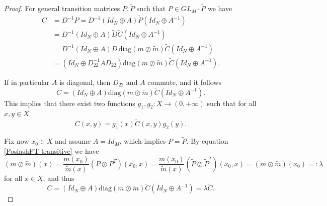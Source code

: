 \documentclass[10pt,a4paper]{amsart}
\begin{document}
\begin{proof} For general transition matrices $P, \tilde P$ such that $P\in GL_M\cdot \tilde P$ we have
\begin{align*}
    C & = D^{-1}P = D^{-1}(Id_N\oplus A) \tilde P (Id_N\oplus A^{-1})
    \\ & = D^{-1}(Id_N\oplus A)\tilde D\tilde C (Id_N\oplus A^{-1})
    \\ & = D^{-1}(Id_N\oplus A)D\,\mbox{diag}(m\oslash \tilde m)\tilde C (Id_N\oplus A^{-1})
    \\ & = (Id_N\oplus D_{22}^{-1}AD_{22}) \mbox{diag}(m\oslash \tilde m) \tilde C (Id_N\oplus A^{-1}).
\end{align*}

If in particular $A$ is diagonal, then $D_{22}$ and $A$ commute, and it follows
$$C =(Id_N\oplus A) \mbox{diag}(m\oslash \tilde m)\tilde C (Id_N\oplus A^{-1}).$$
This implies that there exist two functions $g_1, g_2:X\rightarrow (0,+\infty)$ such that for all $x,y\in X$ 
$$ C(x,y) = g_1(x)\tilde C(x,y)g_2(y). $$ 

Fix now $x_0\in X$ and assume $A=Id_M$, which implies $P= \tilde P$. By equation \eqref{PoslashPT-transitive} we have $$(m\oslash \tilde m)(x) =  \frac{m(x_0)}{\tilde m(x)}(P\oslash P^T)(x_0,x)  = \frac{m(x_0)}{\tilde m(x)}(\tilde P\oslash \tilde P^T)(x_0,x) = (m\oslash \tilde m)(x_0)=:\lambda$$
for all $x\in X$, and thus 
$$ C = (Id_N\oplus A)\mbox{diag}(m\oslash \tilde m) \tilde C (Id_N\oplus A^{-1}) = \lambda \tilde C. $$ 
\end{proof}
\end{document}
